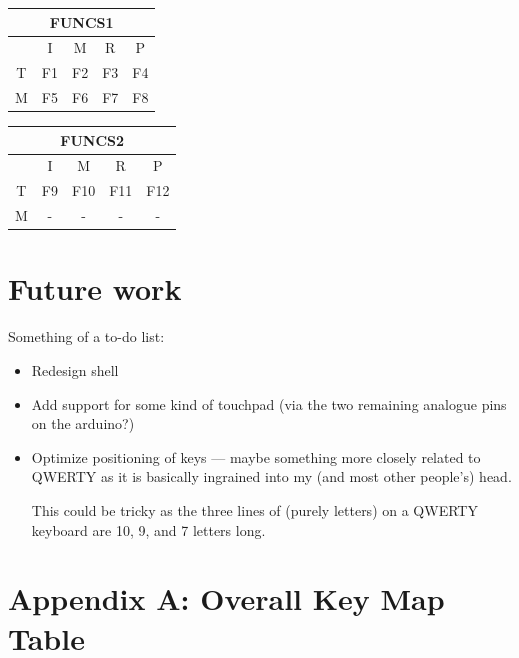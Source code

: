 \documentclass{article}
\begin{document}
\begin{center}
	\begin{table}[!h]
		\begin{subtable}{0.45\textwidth}
			\centering
			\begin{tabular}{|c|c|c|c|c|}
				\hline
				\multicolumn{5}{|c|}{FUNCS1}\\ \hline
				& I & M & R & P \\ \hline
				T & F1 & F2 & F3 & F4 \\ \hline
				M & F5 & F6 & F7 & F8 \\ \hline
			\end{tabular}
		\end{subtable}
		\begin{subtable}{0.45\textwidth}
			\centering
			\begin{tabular}{|c|c|c|c|c|}
				\hline
				\multicolumn{5}{|c|}{FUNCS2}\\ \hline
				& I & M & R & P \\ \hline
				T & F9 & F10 & F11 & F12 \\ \hline
				M & - & - & - & - \\ \hline
			\end{tabular}
		\end{subtable}
	\end{table}
\end{center}

\section{Future work}
Something of a to-do list:

\begin{itemize}
	\item Redesign shell
	\item Add support for some kind of touchpad (via the two remaining analogue pins on the arduino?)
	\item Optimize positioning of keys --- maybe something more closely related to QWERTY as it is basically ingrained into my (and most other people's) head.
	
	This could be tricky as the three lines of (purely letters) on a QWERTY keyboard are 10, 9, and 7 letters long.
\end{itemize}

\newpage\appendix
\section{Appendix A: Overall Key Map Table}
\end{document}
